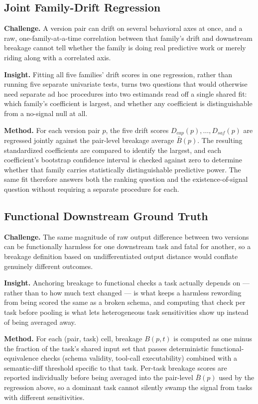 \documentclass[11pt]{article}
\begin{document}
\subsection{Joint Family-Drift Regression}
\textbf{Challenge.} A version pair can drift on several behavioral axes at once, and a raw, one-family-at-a-time correlation between that family's drift and downstream breakage cannot tell whether the family is doing real predictive work or merely riding along with a correlated axis.

\textbf{Insight.} Fitting all five families' drift scores in one regression, rather than running five separate univariate tests, turns two questions that would otherwise need separate ad hoc procedures into two estimands read off a single shared fit: which family's coefficient is largest, and whether any coefficient is distinguishable from a no-signal null at all.

\textbf{Method.} For each version pair $p$, the five drift scores $D_{cap}(p), \dots, D_{saf}(p)$ are regressed jointly against the pair-level breakage average $\bar{B}(p)$. The resulting standardized coefficients are compared to identify the largest, and each coefficient's bootstrap confidence interval is checked against zero to determine whether that family carries statistically distinguishable predictive power. The same fit therefore answers both the ranking question and the existence-of-signal question without requiring a separate procedure for each.

\subsection{Functional Downstream Ground Truth}
\textbf{Challenge.} The same magnitude of raw output difference between two versions can be functionally harmless for one downstream task and fatal for another, so a breakage definition based on undifferentiated output distance would conflate genuinely different outcomes.

\textbf{Insight.} Anchoring breakage to functional checks a task actually depends on --- rather than to how much text changed --- is what keeps a harmless rewording from being scored the same as a broken schema, and computing that check per task before pooling is what lets heterogeneous task sensitivities show up instead of being averaged away.

\textbf{Method.} For each (pair, task) cell, breakage $B(p,t)$ is computed as one minus the fraction of the task's shared input set that passes deterministic functional-equivalence checks (schema validity, tool-call executability) combined with a semantic-diff threshold specific to that task. Per-task breakage scores are reported individually before being averaged into the pair-level $\bar{B}(p)$ used by the regression above, so a dominant task cannot silently swamp the signal from tasks with different sensitivities.
\end{document}
